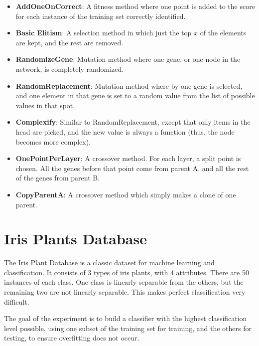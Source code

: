 \documentclass[a4paper,11pt]{report}
\begin{document}
\begin{itemize}
 \item \textbf{AddOneOnCorrect}: A fitness method where one point is added to the score for each instance of the training 
set correctly identified.
 \item \textbf{Basic Elitism}: A selection method in which just the top $x$ of the elements are kept, and the rest are removed.
 \item \textbf{RandomizeGene}: Mutation method where one gene, or one node in the network, is completely randomized.
 \item \textbf{RandomReplacement}: Mutation method where by one gene is selected, and one element in that gene is set to a 
random value from the list of possible values in that spot.
\item \textbf{Complexify}: Similar to RandomReplacement, except that only items in the head are picked, and the new 
value is always a function (thus, the node becomes more complex).
\item \textbf{OnePointPerLayer}: A crossover method. For each layer, a split point is chosen. 
All the genes before that point come from parent A, and all the rest of the genes from parent B. 
\item \textbf{CopyParentA}: A crossover method which simply makes a clone of one parent.
\end{itemize}

\section{Iris Plants Database}
The Iris Plant Database is a classic dataset for machine learning and classification. It consists
of 3 types of iris plants, with 4 attributes. There are 50 instances of each class. One class is 
linearly separable from the others, but the remaining two are not linearly separable. This makes 
perfect classification very difficult.  

The goal of the experiment is to build a classifier with the highest classification level possible, 
using one subset of the training set for training, and the others for testing, to ensure overfitting 
does not occur. 

\end{document}
